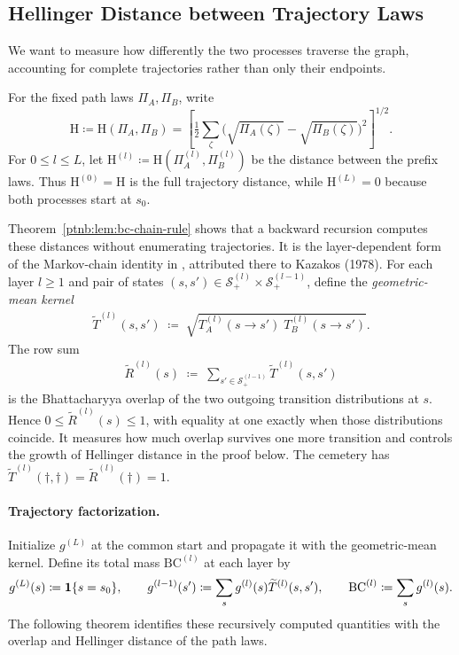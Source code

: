 \subsection{Hellinger Distance between Trajectory Laws}\label{ptnb:sec:lmp-bc}

We want to measure how differently the two processes traverse the graph, accounting for complete trajectories rather than only their endpoints.
\begin{definition}\label{def:trajectory_hellinger}
For the fixed path laws $\Pi_A,\Pi_B$, write
\[
 \mathrm H\coloneqq\mathrm H(\Pi_A,\Pi_B)
 =\left[\tfrac12\sum_{\zeta}
 \bigl(\sqrt{\Pi_A(\zeta)}-\sqrt{\Pi_B(\zeta)}\bigr)^2\right]^{1/2}.
\]
For $0\le l\le L$, let $\mathrm H^{(l)}\coloneqq\mathrm H(\Pi_A^{(l)},\Pi_B^{(l)})$ be the distance between the prefix laws. Thus $\mathrm H^{(0)}=\mathrm H$ is the full trajectory distance, while $\mathrm H^{(L)}=0$ because both processes start at $s_0$.
\end{definition}

Theorem~\ref{ptnb:lem:bc-chain-rule} shows that a backward recursion computes these distances without enumerating trajectories. It is the layer-dependent form of the Markov-chain identity in \textcite[Lemma~5 and Appendix~B]{Daskalakis2018MarkovTesting}, attributed there to Kazakos (1978).
For each layer $l \geq 1$ and pair of states $(s, s') \in \mathcal{S}^{(l)}_+ \times
    \mathcal{S}^{(l-1)}_+$, define the \emph{geometric-mean kernel}
\begin{align}\label{ptnb:eq:geom-kernel}
    \widetilde{T}^{(l)}(s, s') \;\coloneqq\; \sqrt{T^{(l)}_A(s \to s')\; T^{(l)}_B(s \to s')}.
\end{align}
The row sum
\begin{align}\label{ptnb:eq:geom-rowsum}
    \widetilde{R}^{(l)}(s) \;\coloneqq\; \sum_{s' \in \mathcal{S}^{(l-1)}_+} \widetilde{T}^{(l)}(s, s')
\end{align}
is the Bhattacharyya overlap of the two outgoing transition distributions at $s$. Hence $0\le\widetilde R^{(l)}(s)\le1$, with equality at one exactly when those distributions coincide. It measures how much overlap survives one more transition and controls the growth of Hellinger distance in the proof below. The cemetery has $\widetilde T^{(l)}(\dagger,\dagger)=\widetilde R^{(l)}(\dagger)=1$.

\paragraph{Trajectory factorization.}\label{ptnb:sec:lmp-chain-rule}
Initialize $g^{(L)}$ at the common start and propagate it with the geometric-mean kernel. Define its total mass $\mathrm{BC}^{(l)}$ at each layer by
\begin{equation}\label{ptnb:eq:overlap-recursion}
 g^{(L)}(s)\coloneqq\mathbf{1}\{s=s_0\},\qquad
 g^{(l-1)}(s')\coloneqq\sum_s g^{(l)}(s)\widetilde T^{(l)}(s,s'),\qquad
 \mathrm{BC}^{(l)}\coloneqq\sum_s g^{(l)}(s).
\end{equation}
The following theorem identifies these recursively computed quantities with the overlap and Hellinger distance of the path laws.

